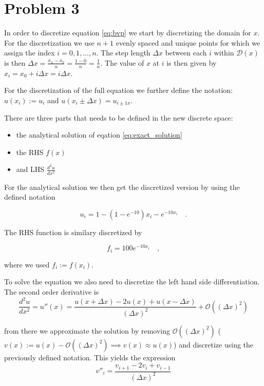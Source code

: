 \documentclass[final, 3p, times, 11.5pt]{article}
\begin{document}
\section*{Problem 3}


In order to discretize equation \eqref{eq:bvp} we start by discretizing the domain for $x$. For the discretization we use $n+1$ evenly spaced and unique points for which we assign the index $i=0, 1, ..., n$. The step length $\Delta x$ between each $i$ within $\mathcal{D}(x)$ is then $\Delta x = \frac{x_n - x_0}{n} = \frac{1-0}{n}=\frac{1}{n}$. The value of $x$ at $i$ is then given by $x_i = x_0 + i\Delta x = i\Delta x$. 

For the discretization of the full equation we further define the notation: $u(x_i) := u_i$ and $u(x_i \pm \Delta x) = u_{i\pm 1 x}$. 

There are three parts that needs to be defined in the new discrete space:
\begin{itemize}
    \item the analytical solution of eqation \eqref{eq:exact_solution}
    \item the RHS $f(x)$
    \item and LHS $\frac{d^{2}u}{dx^{2}}$
\end{itemize}


For the analytical solution we then get the discretized version by using the defined notation

\begin{equation}
\label{eq:discrete_u_i}
    u_i = 1 - (1-e^{-10})x_i - e^{-10x_i} \quad .
\end{equation}

The RHS function is similary discretized by 

\begin{equation}
\label{eq:discrete_f_i}
     f_i = 100e^{-10x_i} \quad , 
\end{equation}

where we used $f_i := f(x_i)$. 

To solve the equation we also need to discretize the left hand side differentiation. The second order derivative is 
\begin{equation}
\frac{d^{2}u}{dx^{2}} = u''(x) =  
\frac{u(x+\Delta x) - 2u(x) + u(x-\Delta x)}{(\Delta x)^{2}} +
\mathcal{O}((\Delta x )^{2})
\end{equation}

from there we approximate the solution by removing $\mathcal{O}((\Delta x )^{2})$ ($v(x) := u(x) - \mathcal{O}((\Delta x )^{2}) \implies v(x) \approx u(x)$) and discretize using the previously defined notation. This yields the expression
$$
v''_i = 
\frac{v_{i+1} - 2v_i + v_{i-1}}{(\Delta x)^2} 
$$
\end{document}
